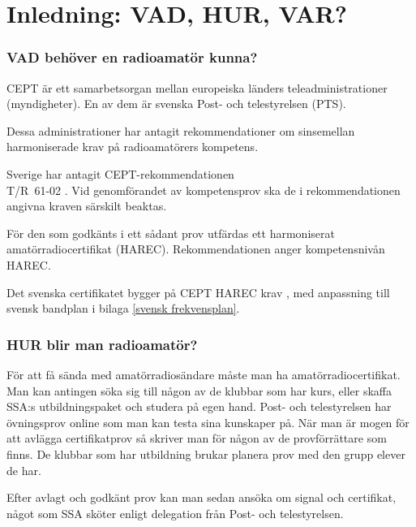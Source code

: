 
\chapter*{Inledning: VAD, HUR, VAR?}

\subsection*{VAD behöver en radioamatör kunna?}

CEPT är ett samarbetsorgan mellan europeiska länders teleadministrationer
(myndigheter). En av dem är svenska Post- och telestyrelsen (PTS).

Dessa administrationer har antagit rekommendationer om sinsemellan
harmoniserade krav på radioamatörers kompetens.

Sverige har antagit CEPT-rekommendationen\\
T/R~61-02 \cite{TR6102}.
Vid genomförandet av kompetensprov ska de i rekommendationen
angivna kraven särskilt beaktas.

För den som godkänts i ett sådant prov utfärdas ett harmoniserat
amatörradiocertifikat (HAREC).
Rekommendationen anger kompetensnivån HAREC.

Det svenska certifikatet bygger på CEPT HAREC krav \cite{TR6102},
med anpassning till svensk bandplan i bilaga \ref{svensk frekvensplan}.

\subsection*{HUR blir man radioamatör?}

För att få sända med amatörradiosändare måste man ha amatörradiocertifikat.
Man kan antingen söka sig till någon av de klubbar som har kurs, eller skaffa
SSA:s utbildningspaket och studera på egen hand.
Post- och telestyrelsen har övningsprov online som man kan testa sina kunskaper
på.
När man är mogen för att avlägga certifikatprov så skriver man för någon av de
provförrättare som finns.
De klubbar som har utbildning brukar planera prov med den grupp elever de har.

\newpage

Efter avlagt och godkänt prov kan man sedan ansöka om signal och certifikat,
något som SSA sköter enligt delegation från Post- och telestyrelsen.


